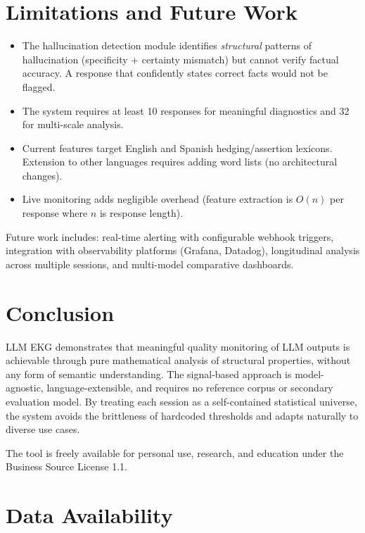\documentclass[11pt,a4paper]{article}
\begin{document}
\section{Limitations and Future Work}

\begin{itemize}[nosep]
    \item The hallucination detection module identifies \emph{structural} patterns of hallucination (specificity + certainty mismatch) but cannot verify factual accuracy. A response that confidently states correct facts would not be flagged.
    \item The system requires at least 10 responses for meaningful diagnostics and 32 for multi-scale analysis.
    \item Current features target English and Spanish hedging/assertion lexicons. Extension to other languages requires adding word lists (no architectural changes).
    \item Live monitoring adds negligible overhead (feature extraction is $O(n)$ per response where $n$ is response length).
\end{itemize}

Future work includes: real-time alerting with configurable webhook triggers, integration with observability platforms (Grafana, Datadog), longitudinal analysis across multiple sessions, and multi-model comparative dashboards.

\section{Conclusion}

LLM EKG demonstrates that meaningful quality monitoring of LLM outputs is achievable through pure mathematical analysis of structural properties, without any form of semantic understanding. The signal-based approach is model-agnostic, language-extensible, and requires no reference corpus or secondary evaluation model. By treating each session as a self-contained statistical universe, the system avoids the brittleness of hardcoded thresholds and adapts naturally to diverse use cases.

The tool is freely available for personal use, research, and education under the Business Source License 1.1.

\section*{Data Availability}
\end{document}
